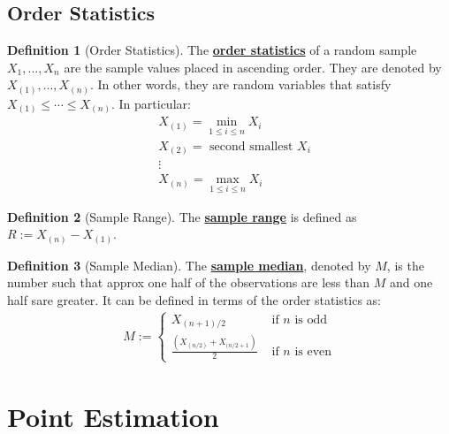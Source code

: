 \documentclass[11pt]{scrartcl}
\theoremstyle{definition}
\newtheorem{definition}{Definition}
\theoremstyle{remark}
\newcommand{\dfn}[1]{\textbf{\underline{#1}}}
\begin{document}
\subsection{Order Statistics}
\begin{definition}[Order Statistics]
	The \dfn{order statistics} of a random sample $X_1, ..., X_n$ are the sample values placed in ascending order. They are denoted by $X_{(1)}, ..., X_{(n)}$. In other words, they are random variables that satisfy $X_{(1)} \leq \cdots \leq X_{(n)}$. In particular: 
	\begin{align*}
		& X_{(1)} = \min_{1 \leq i \leq n} X_i \\
		& X_{(2)} = \text{ second smallest } X_i \\
		& \vdots 	\\
		& X_{(n)} = \max_{1 \leq i \leq n } X_i 
	\end{align*}
\end{definition}


\begin{definition}[Sample Range]
	The \dfn{sample range} is defined as $R:= X_{(n)} - X_{(1)}$. 
\end{definition}

\begin{definition}[Sample Median]
	The \dfn{sample median}, denoted by $M$, is the number such that approx one half of the observations are less than $M$ and one half sare greater. It can be defined in terms of the order statistics as: 
	\begin{align*}
		M := \begin{cases}
			X_{(n+1)/2} & \text{ if $n$ is odd} \\
			\frac{(X_{(n/2)} + X_{(n/2+1})}{2} & \text{ if $n$ is even}
		\end{cases}	
	\end{align*}
\end{definition}

\section{Point Estimation}
\end{document}
